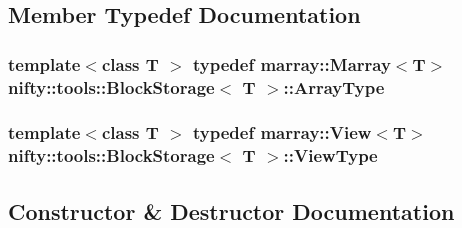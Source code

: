 \subsection{Member Typedef Documentation}
\hypertarget{classnifty_1_1tools_1_1BlockStorage_aadae8d95280c9262f19ea9237a0c3f9b}{}
\subsubsection[{Array\+Type}]{\setlength{\rightskip}{0pt plus 5cm}template$<$class T $>$ typedef marray\+::\+Marray$<$T$>$ {\bf nifty\+::tools\+::\+Block\+Storage}$<$ T $>$\+::{\bf Array\+Type}}\label{classnifty_1_1tools_1_1BlockStorage_aadae8d95280c9262f19ea9237a0c3f9b}
\hypertarget{classnifty_1_1tools_1_1BlockStorage_a9dd09d47fecd6aedc1c9bd84e526e84e}{}
\subsubsection[{View\+Type}]{\setlength{\rightskip}{0pt plus 5cm}template$<$class T $>$ typedef marray\+::\+View$<$T$>$ {\bf nifty\+::tools\+::\+Block\+Storage}$<$ T $>$\+::{\bf View\+Type}}\label{classnifty_1_1tools_1_1BlockStorage_a9dd09d47fecd6aedc1c9bd84e526e84e}


\subsection{Constructor \& Destructor Documentation}
\hypertarget{classnifty_1_1tools_1_1BlockStorage_a95d95c49b1a1ed51c6d794d3fe8f2645}{}
